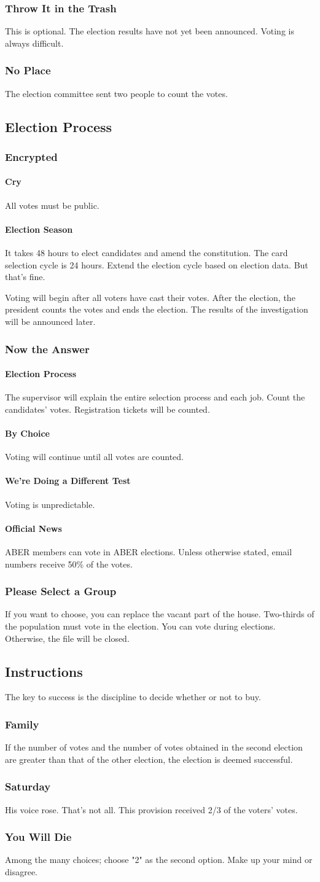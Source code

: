 \documentclass{article}
\newcommand{\asection}[1]{\subsection{#1} \label{#1}}
\newcommand{\asubsection}[1]{\subsubsection{#1} \label{#1}}
\newcommand{\asubsubsection}[1]{\paragraph{#1} \label{#1}}
\begin{document}
\asubsection{Throw It in the Trash}
This is optional. The election results have not yet been announced.
Voting is always difficult.

\asubsection{No Place}
The election committee sent two people to count the votes.

\asection{Election Process}

\asubsection{Encrypted}

\asubsubsection{Cry}
All votes must be public.

\asubsubsection{Election Season}
It takes 48 hours to elect candidates and amend the constitution.
The card selection cycle is 24 hours.
Extend the election cycle based on election data. But that's fine.

Voting will begin after all voters have cast their votes.
After the election, the president counts the votes and ends the election.
The results of the investigation will be announced later.

\asubsection{Now the Answer}

\asubsubsection{Election Process}
The supervisor will explain the entire selection process and each job.
Count the candidates' votes.
Registration tickets will be counted.

\asubsubsection{By Choice}
Voting will continue until all votes are counted.

\asubsubsection{We’re Doing a Different Test}
Voting is unpredictable.

\asubsubsection{Official News}
ABER members can vote in ABER elections.
Unless otherwise stated, email numbers receive 50\% of the votes.

\asubsection{Please Select a Group}
If you want to choose, you can replace the vacant part of the house.
Two-thirds of the population must vote in the election.
You can vote during elections. Otherwise, the file will be closed.

\asection{Instructions}
The key to success is the discipline to decide whether or not to buy.

\asubsection{Family}
If the number of votes and the number of votes obtained in the second election are greater than that of the other election, the election is deemed successful.

\asubsection{Saturday}
His voice rose. That's not all.
This provision received 2/3 of the voters' votes.

\asubsection{You Will Die}
Among the many choices; choose "2" as the second option. Make up your mind or disagree.
\end{document}
